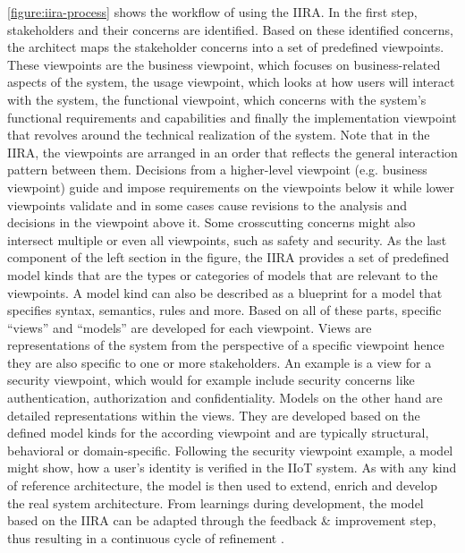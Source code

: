         \autoref{figure:iira-process} shows the workflow of using the IIRA. In the first step, stakeholders and their concerns are identified. Based on these identified concerns, the architect maps the stakeholder concerns into a set of predefined viewpoints. These viewpoints are the business viewpoint, which focuses on business-related aspects of the system, the usage viewpoint, which looks at how users will interact with the system, the functional viewpoint, which concerns with the system's functional requirements and capabilities and finally the implementation viewpoint that revolves around the technical realization of the system. Note that in the IIRA, the viewpoints are arranged in an order that reflects the general interaction pattern between them. Decisions from a higher-level viewpoint (e.g. business viewpoint) guide and impose requirements on the viewpoints below it while lower viewpoints validate and in some cases cause revisions to the analysis and decisions in the viewpoint above it. Some crosscutting concerns might also intersect multiple or even all viewpoints, such as safety and security. As the last component of the left section in the figure, the IIRA provides a set of predefined model kinds that are the types or categories of models that are relevant to the viewpoints. A model kind can also be described as a blueprint for a model that specifies syntax, semantics, rules and more. 
        Based on all of these parts, specific ``views'' and ``models'' are developed for each viewpoint. Views are representations of the system from the perspective of a specific viewpoint hence they are also specific to one or more stakeholders. An example is a view for a security viewpoint, which would for example include security concerns like authentication, authorization and confidentiality. Models on the other hand are detailed representations within the views. They are developed based on the defined model kinds for the according viewpoint and are typically structural, behavioral or domain-specific. Following the security viewpoint example, a model might show, how a user's identity is verified in the IIoT system. As with any kind of reference architecture, the model is then used to extend, enrich and develop the real system architecture. From learnings during development, the model based on the IIRA can be adapted through the feedback \& improvement step, thus resulting in a continuous cycle of refinement \cite{iiot_consort_iira}. \newline 

